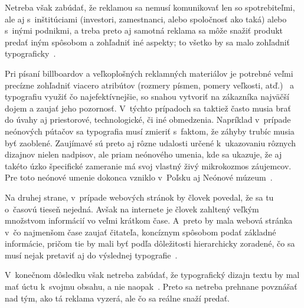 \documentclass[11pt,a4paper]{article}
\begin{document}
Netreba však zabúdať, že reklamou sa nemusí komunikovať len so spotrebiteľmi, ale aj s~inštitúciami (investori, zamestnanci, 
alebo spoločnosť ako taká) alebo s~inými podnikmi, a treba preto aj samotná reklama sa môže snažiť produkt predať iným spôsobom a zohľadniť iné aspekty; to všetko by sa malo zohľadniť typograficky~\cite{book-white}.


Pri písaní billboardov a veľkoplošných reklamných materiálov je potrebné veľmi precízne zohľadniť viacero atribútov 
(rozmery písmen, pomery veľkosti, atď.)~\cite{serial-legge-bigelow} a typografiu využiť čo najefektívnejšie, 
so snahou vytvoriť na zákazníka najväčší dojem a zaujať jeho pozornosť. 
V~týchto prípadoch sa taktiež často musia brať do úvahy aj priestorové, technologické, či iné obmedzenia. 
Napríklad v~prípade neónových pútačov sa typografia musí zmieriť s~faktom, že záhyby trubíc musia byť zaoblené. 
Zaujímavé sú preto aj rôzne udalosti určené k~ukazovaniu rôznych dizajnov nielen nadpisov, ale priam neónového umenia,
kde sa ukazuje, že aj takéto úzko špecifické zameranie má svoj vlastný živý mikrokozmos záujemcov. 
Pre toto neónové umenie dokonca vzniklo v~Poľsku aj Neónové múzeum~\cite{mag-eye}.


Na druhej strane, v~prípade webových stránok by človek povedal, že sa tu o~časovú tieseň nejedná. 
Avšak na internete je človek zahltený veľkým množstvom informácií vo veľmi krátkom čase. 
A~preto by mala webová stránka v~čo najmenšom čase zaujať čitateľa, koncíznym spôsobom podať základné informácie, 
pričom tie by mali byť podľa dôležitosti hierarchicky zoradené, čo sa musí nejak pretaviť aj do výslednej typografie~\cite{el-holmstrom}.

V~konečnom dôsledku však netreba zabúdať, že typografický dizajn textu by mal mať úctu 
k~svojmu obsahu, a nie naopak~\cite{book-bringhurst}. Preto sa netreba prehnane povznášať nad tým, ako tá reklama vyzerá, ale čo sa reálne snaží predať.

\newpage


\end{document}

